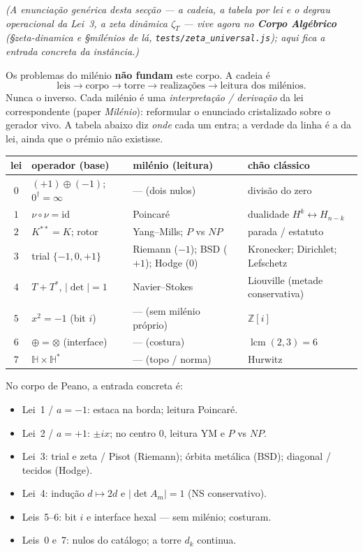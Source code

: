 \documentclass[11pt,a4paper]{article}
\newcommand{\code}[1]{\texttt{#1}}
\begin{document}
\noindent\emph{(A enunciação genérica desta secção --- a cadeia, a
tabela por lei e o degrau operacional da Lei~3, a zeta dinâmica
$\zeta_{T}$ --- vive agora no \textbf{Corpo Algébrico}
(\S zeta-dinamica e \S milénios de lá, \code{tests/zeta\_universal.js});
aqui fica a entrada concreta da instância.)}

Os problemas do milénio \textbf{não fundam} este corpo.
A cadeia é
\[\text{leis}\to\text{corpo}\to\text{torre}\to\text{realizações}\to\text{leitura dos milénios}.\]
Nunca o inverso. Cada milénio é uma \emph{interpretação / derivação}
da lei correspondente (paper \emph{Milénio}): reformular o enunciado
cristalizado sobre o gerador vivo.
A tabela abaixo diz \emph{onde} cada um entra; a verdade da linha é a
da lei, ainda que o prémio não existisse.

\begin{center}\small
\begin{tabular}{@{}clll@{}}
lei & operador (base) & milénio (leitura) & chão clássico \\
\hline
$0$ & $(+1)\oplus(-1)$; $0^{\dagger}=\infty$ & --- (dois nulos) & divisão do zero \\
$1$ & $\nu\circ\nu=\mathrm{id}$ & Poincaré & dualidade $H^{k}\!\leftrightarrow\!H_{n-k}$ \\
$2$ & $K^{**}=K$; rotor & Yang--Mills; $P$ vs $NP$ & parada / estatuto \\
$3$ & trial $\{-1,0,+1\}$ & Riemann ($-1$); BSD ($+1$); Hodge ($0$) & Kronecker; Dirichlet; Lefschetz \\
$4$ & $T+T^{*}$, $|\det|=1$ & Navier--Stokes & Liouville (metade conservativa) \\
$5$ & $x^{2}=-1$ (bit $i$) & --- (sem milénio próprio) & $\mathbb{Z}[i]$ \\
$6$ & $\oplus=\otimes$ (interface) & --- (costura) & $\operatorname{lcm}(2,3)=6$ \\
$7$ & $\mathbb{H}\times\mathbb{H}^{*}$ & --- (topo / norma) & Hurwitz \\
\end{tabular}
\end{center}

\noindent No corpo de Peano, a entrada concreta é:
\begin{itemize}
\item Lei~1 / $a=-1$: estaca na borda; leitura Poincaré.
\item Lei~2 / $a=+1$: $\pm ix$; no centro $0$, leitura YM e $P$ vs $NP$.
\item Lei~3: trial e zeta / Pisot (Riemann); órbita metálica (BSD);
diagonal / tecidos (Hodge).
\item Lei~4: indução $d\mapsto2d$ e $\lvert\det A_m\rvert=1$ (NS
conservativo).
\item Leis~5--6: bit $i$ e interface hexal --- sem milénio; costuram.
\item Leis~0 e~7: nulos do catálogo; a torre $d_k$ continua.
\end{itemize}
\end{document}
